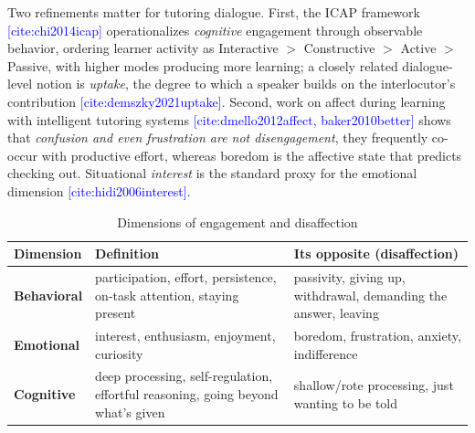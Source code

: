 \documentclass[11pt]{article}
\newcommand{\cit}[1]{\textcolor{blue}{[\textsf{cite:#1}]}}
\begin{document}
Two refinements matter for tutoring dialogue.
First, the ICAP framework \cit{chi2014icap} operationalizes \emph{cognitive} engagement through observable behavior, ordering learner activity as
Interactive $>$ Constructive $>$ Active $>$ Passive, with higher modes producing more learning; 
a closely related dialogue-level notion is \emph{uptake}, the degree to which a speaker builds on the interlocutor's
contribution \cit{demszky2021uptake}. 
Second, work on affect during learning with intelligent tutoring systems \cit{dmello2012affect, baker2010better} shows that \emph{confusion and even frustration are not
disengagement}, they frequently co-occur with productive effort, 
whereas boredom is the affective state that predicts checking out. 
Situational \emph{interest} is the standard proxy for the emotional dimension \cit{hidi2006interest}.

\begin{table}[h]
\centering
\begin{tabular}{|l|p{7cm}|p{7cm}|}
\hline
\textbf{Dimension} & \textbf{Definition} & \textbf{Its opposite (disaffection)} \\
\hline
\textbf{Behavioral} & participation, effort, persistence, on-task attention, staying present & passivity, giving up, withdrawal, demanding the answer, leaving \\
\hline
\textbf{Emotional} & interest, enthusiasm, enjoyment, curiosity & boredom, frustration, anxiety, indifference \\
\hline
\textbf{Cognitive} & deep processing, self-regulation, effortful reasoning, going beyond what's given & shallow/rote processing, just wanting to be told \\
\hline
\end{tabular}
\caption{Dimensions of engagement and disaffection}
\end{table}
\end{document}
